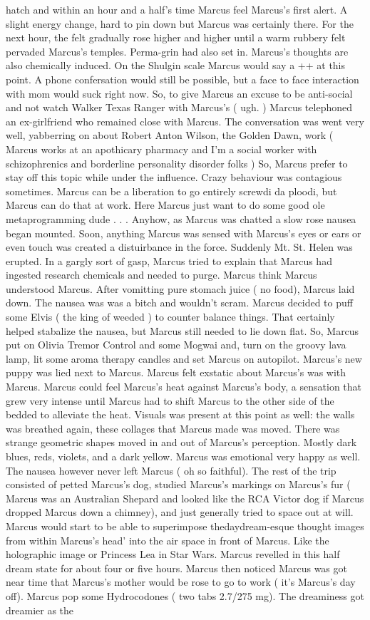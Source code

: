 \documentclass[12pt]{book}
\begin{document}
hatch and within an hour and a half's time Marcus feel Marcus's first alert. A slight energy change, hard to pin down but Marcus was certainly there. For the next hour, the felt gradually rose higher and higher until a warm rubbery felt pervaded Marcus's temples. Perma-grin had also set in. Marcus's thoughts are also chemically induced. On the Shulgin scale Marcus would say a ++ at this point. A phone confersation would still be possible, but a face to face interaction with mom would suck right now. So, to give Marcus an excuse to be anti-social and not watch Walker Texas Ranger with Marcus's ( ugh. ) Marcus telephoned an ex-girlfriend who remained close with Marcus. The conversation was went very well, yabberring on about Robert Anton Wilson, the Golden Dawn, work ( Marcus works at an apothicary pharmacy and I'm a social worker with schizophrenics and borderline personality disorder folks ) So, Marcus prefer to stay off this topic while under the influence. Crazy behaviour was contagious sometimes. Marcus can be a liberation to go entirely screwdi da ploodi, but Marcus can do that at work. Here Marcus just want to do some good ole metaprogramming dude . . .  Anyhow, as Marcus was chatted a slow rose nausea began mounted. Soon, anything Marcus was sensed with Marcus's eyes or ears or even touch was created a distuirbance in the force. Suddenly Mt. St. Helen was erupted. In a gargly sort of gasp, Marcus tried to explain that Marcus had ingested research chemicals and needed to purge. Marcus think Marcus understood Marcus. After vomitting pure stomach juice ( no food), Marcus laid down. The nausea was was a bitch and wouldn't scram. Marcus decided to puff some Elvis ( the king of weeded ) to counter balance things. That certainly helped stabalize the nausea, but Marcus still needed to lie down flat. So, Marcus put on Olivia Tremor Control and some Mogwai and, turn on the groovy lava lamp, lit some aroma therapy candles and set Marcus on autopilot. Marcus's new puppy was lied next to Marcus. Marcus felt exstatic about Marcus's was with Marcus. Marcus could feel Marcus's heat against Marcus's body, a sensation that grew very intense until Marcus had to shift Marcus to the other side of the bedded to alleviate the heat. Visuals was present at this point as well: the walls was breathed again, these collages that Marcus made was moved. There was strange geometric shapes moved in and out of Marcus's perception. Mostly dark blues, reds, violets, and a dark yellow. Marcus was emotional very happy as well. The nausea however never left Marcus ( oh so faithful). The rest of the trip consisted of petted Marcus's dog, studied Marcus's markings on Marcus's fur ( Marcus was an Australian Shepard and looked like the RCA Victor dog if Marcus dropped Marcus down a chimney), and just generally tried to space out at will. Marcus would start to be able to superimpose thedaydream-esque thought images from within Marcus's head' into the air space in front of Marcus. Like the holographic image or Princess Lea in Star Wars. Marcus revelled in this half dream state for about four or five hours. Marcus then noticed Marcus was got near time that Marcus's mother would be rose to go to work ( it's Marcus's day off). Marcus pop some Hydrocodones ( two tabs 2.7/275 mg). The dreaminess got dreamier as the 
\end{document}
